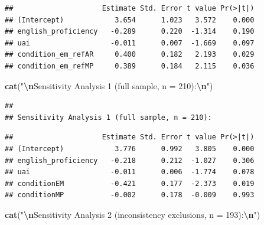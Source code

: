 \documentclass[
]{article}
\newenvironment{Shaded}{\begin{snugshade}}{\end{snugshade}}
\newcommand{\DecValTok}[1]{\textcolor[rgb]{0.00,0.00,0.81}{#1}}
\newcommand{\FunctionTok}[1]{\textcolor[rgb]{0.13,0.29,0.53}{\textbf{#1}}}
\newcommand{\NormalTok}[1]{#1}
\newcommand{\SpecialCharTok}[1]{\textcolor[rgb]{0.81,0.36,0.00}{\textbf{#1}}}
\newcommand{\StringTok}[1]{\textcolor[rgb]{0.31,0.60,0.02}{#1}}
\begin{document}
\begin{verbatim}
##                     Estimate Std. Error t value Pr(>|t|)
## (Intercept)            3.654      1.023   3.572    0.000
## english_proficiency   -0.289      0.220  -1.314    0.190
## uai                   -0.011      0.007  -1.669    0.097
## condition_em_refAR     0.400      0.182   2.193    0.029
## condition_em_refMP     0.389      0.184   2.115    0.036
\end{verbatim}

\begin{Shaded}
\begin{Highlighting}[]
\FunctionTok{cat}\NormalTok{(}\StringTok{"}\SpecialCharTok{\textbackslash{}n}\StringTok{Sensitivity Analysis 1 (full sample, n = 210):}\SpecialCharTok{\textbackslash{}n}\StringTok{"}\NormalTok{)}
\end{Highlighting}
\end{Shaded}

\begin{verbatim}
## 
## Sensitivity Analysis 1 (full sample, n = 210):
\end{verbatim}

\begin{Shaded}
\end{Shaded}

\begin{verbatim}
##                     Estimate Std. Error t value Pr(>|t|)
## (Intercept)            3.776      0.992   3.805    0.000
## english_proficiency   -0.218      0.212  -1.027    0.306
## uai                   -0.011      0.006  -1.774    0.078
## conditionEM           -0.421      0.177  -2.373    0.019
## conditionMP           -0.002      0.178  -0.009    0.993
\end{verbatim}

\begin{Shaded}
\begin{Highlighting}[]
\FunctionTok{cat}\NormalTok{(}\StringTok{"}\SpecialCharTok{\textbackslash{}n}\StringTok{Sensitivity Analysis 2 (inconsistency exclusions, n = 193):}\SpecialCharTok{\textbackslash{}n}\StringTok{"}\NormalTok{)}
\end{Highlighting}
\end{Shaded}
\end{document}

